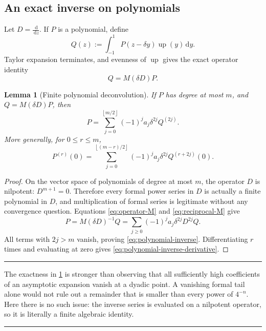 \documentclass[11pt,oneside]{article}
\newtheorem{lemma}[theorem]{Lemma}
\theoremstyle{definition}
\theoremstyle{remark}
\newcommand{\up}{\operatorname{up}}
\newcommand{\dd}{\,\mathrm d}
\newcommand{\floor}[1]{\left\lfloor#1\right\rfloor}
\newenvironment{boxedremark}{%
  \par\smallskip\noindent\begin{center}\begin{minipage}{0.94\textwidth}%
  \color{black}\hrule\vspace{0.6em}\small
}{%
  \vspace{0.6em}\hrule\end{minipage}\end{center}\smallskip
}
\begin{document}
\subsection{An exact inverse on polynomials}

Let \(D=\frac{\dd}{\dd z}\).  If \(P\) is a polynomial, define
\begin{equation}\label{eq:Q-polynomial}
 Q(z):=\int_{-1}^{1}P(z-\delta y)\up(y)\dd y.
\end{equation}
Taylor expansion terminates, and evenness of \(\up\) gives the exact operator
identity
\begin{equation}\label{eq:operator-M}
 Q=M(\delta D)P.
\end{equation}

\begin{lemma}[Finite polynomial deconvolution]\label{lem:polynomial-inverse}
If \(P\) has degree at most \(m\), and \(Q=M(\delta D)P\), then
\begin{equation}\label{eq:polynomial-inverse}
 \boxed{\displaystyle
 P=\sum_{j=0}^{\floor{m/2}}(-1)^ja_j\delta^{2j}Q^{(2j)}.}
\end{equation}
More generally, for \(0\le r\le m\),
\begin{equation}\label{eq:polynomial-inverse-derivative}
 P^{(r)}(0)=
 \sum_{j=0}^{\floor{(m-r)/2}}(-1)^ja_j\delta^{2j}Q^{(r+2j)}(0).
\end{equation}
\end{lemma}

\begin{proof}
On the vector space of polynomials of degree at most \(m\), the operator
\(D\) is nilpotent: \(D^{m+1}=0\).  Therefore every formal power series in
\(D\) is actually a finite polynomial in \(D\), and multiplication of formal
series is legitimate without any convergence question.  Equations
\eqref{eq:operator-M} and \eqref{eq:reciprocal-M} give
\[
 P=M(\delta D)^{-1}Q
  =\sum_{j\ge0}(-1)^ja_j\delta^{2j}D^{2j}Q.
\]
All terms with \(2j>m\) vanish, proving \eqref{eq:polynomial-inverse}.
Differentiating \(r\) times and evaluating at zero gives
\eqref{eq:polynomial-inverse-derivative}.
\end{proof}

\begin{boxedremark}
The exactness in \cref{lem:polynomial-inverse} is stronger than observing that
all sufficiently high coefficients of an asymptotic expansion vanish at a
dyadic point.  A vanishing formal tail alone would not rule out a remainder
that is smaller than every power of \(4^{-n}\).  Here there is no such issue:
the inverse series is evaluated on a nilpotent operator, so it is literally a
finite algebraic identity.
\end{boxedremark}
\end{document}
